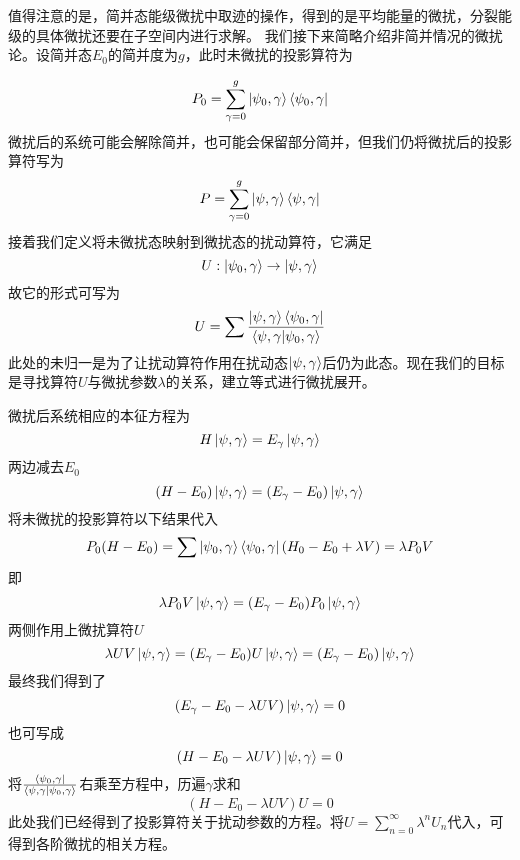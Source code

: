 \documentclass[12pt, a4paper, oneside]{ctexart}
\begin{document}
值得注意的是，简并态能级微扰中取迹的操作，得到的是平均能量的微扰，分裂能级的具体微扰还要在子空间内进行求解。
\newpage
我们接下来简略介绍非简并情况的微扰论。设简并态$E_0$的简并度为$g$，此时未微扰的投影算符为

\begin{equation}
    P_0=\sum_{\gamma=0}^{g}\ket{\psi_0,\gamma}\bra{\psi_0,\gamma}
\end{equation}
微扰后的系统可能会解除简并，也可能会保留部分简并，但我们仍将微扰后的投影算符写为
\begin{equation}
    P=\sum_{\gamma=0}^{g}\ket{\psi,\gamma}\bra{\psi,\gamma}
\end{equation}
接着我们定义将未微扰态映射到微扰态的扰动算符，它满足
\begin{equation}
    U:\ket{\psi_0,\gamma}\rightarrow\ket{\psi,\gamma}
\end{equation}
故它的形式可写为
\begin{equation}
    U=\sum \frac{\ket{\psi,\gamma}\bra{\psi_0,\gamma}}{\langle\psi,\gamma|\psi_0,\gamma\rangle}
\end{equation}
此处的未归一是为了让扰动算符作用在扰动态$\ket{\psi,\gamma}$后仍为此态。现在我们的目标是寻找算符$U$与微扰参数$\lambda$的关系，建立等式进行微扰展开。

微扰后系统相应的本征方程为
\begin{equation}
    H\ket{\psi,\gamma}=E_{\gamma}\ket{\psi,\gamma}
\end{equation}
两边减去$E_0$
\begin{equation}
    (H-E_0)\ket{\psi,\gamma }=(E_\gamma-E_0)\ket{\psi,\gamma}
\end{equation}
将未微扰的投影算符以下结果代入
\begin{equation}
    P_0(H-E_0)=\sum \ket{\psi_0,\gamma}\bra{\psi_0,\gamma}(H_0-E_0+\lambda V)=\lambda P_0 V
\end{equation}
即
\begin{equation}
    \lambda P_0 V\ket{\psi,\gamma }=(E_{\gamma}-E_0)P_0\ket{\psi,\gamma }
\end{equation}
两侧作用上微扰算符$U$
\begin{equation}
    \lambda UV\ket{\psi,\gamma }=(E_{\gamma}-E_0)U\ket{\psi,\gamma }=(E_{\gamma}-E_0)\ket{\psi,\gamma }
\end{equation}
最终我们得到了
\begin{equation}
    (E_{\gamma}-E_0-\lambda UV)\ket{\psi,\gamma }=0
\end{equation}
也可写成
\begin{equation}
    (H-E_0-\lambda UV)\ket{\psi,\gamma }=0
\end{equation}
将$\frac{\bra{\psi_0,\gamma}}{\langle\psi,\gamma|\psi_0,\gamma\rangle}$右乘至方程中，历遍$\gamma$求和
\begin{equation}
    (H-E_0-\lambda UV)U=0
\end{equation}
此处我们已经得到了投影算符关于扰动参数的方程。将$U=\sum_{n=0}^{\infty}\lambda^n U_n$代入，可得到各阶微扰的相关方程。
\newpage
\end{document}
